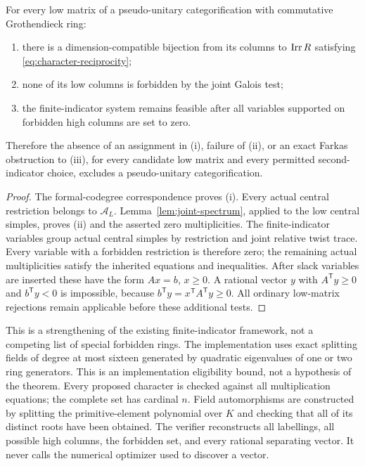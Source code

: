 \begin{theorem}
\label{thm:character-induction}
For every low matrix of a pseudo-unitary categorification with
commutative Grothendieck ring:
\begin{enumerate}[label=(\roman*)]
\item there is a dimension-compatible bijection from its columns to
$\operatorname{Irr} R$ satisfying \eqref{eq:character-reciprocity};
\item none of its low columns is forbidden by the joint Galois test;
\item the finite-indicator system remains feasible after all variables
supported on forbidden high columns are set to zero.
\end{enumerate}
Therefore the absence of an assignment in (i), failure of (ii), or an
exact Farkas obstruction to (iii), for every candidate low matrix and
every permitted second-indicator choice, excludes a pseudo-unitary
categorification.
\end{theorem}
\begin{proof}
The formal-codegree correspondence proves (i). Every actual central
restriction belongs to $\mathcal A_L$. Lemma~\ref{lem:joint-spectrum},
applied to the low central simples, proves (ii) and the asserted zero
multiplicities. The finite-indicator variables group actual central
simples by restriction and joint relative twist trace. Every variable
with a forbidden restriction is therefore zero; the remaining actual
multiplicities satisfy the inherited equations and inequalities.
After slack variables are inserted these have the form $Ax=b$, $x\ge0$.
A rational vector $y$ with $A^{\mathsf T}y\ge0$ and $b^{\mathsf T}y<0$
is impossible, because $b^{\mathsf T}y=x^{\mathsf T}A^{\mathsf T}y\ge0$.
All ordinary low-matrix rejections remain applicable before these
additional tests.
\end{proof}

This is a strengthening of the existing finite-indicator framework,
not a competing list of special forbidden rings. The implementation
uses exact splitting fields of degree at most sixteen generated by
quadratic eigenvalues of one or two ring generators. This is an
implementation eligibility bound, not a hypothesis of the theorem.
Every proposed character is checked against all multiplication
equations; the complete set has cardinal $n$. Field automorphisms are
constructed by splitting the primitive-element polynomial over $K$ and
checking that all of its distinct roots have been obtained. The verifier
reconstructs all labellings, all possible high columns, the forbidden
set, and every rational separating vector. It never calls the numerical
optimizer used to discover a vector.

